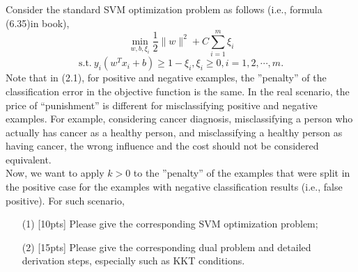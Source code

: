 \begin{problem}
    Consider the standard SVM optimization problem as follows (i.e., formula (6.35)in book),
    \[\min_{w,b,\xi_{i}}\frac{1}{2}\|w\|^2+C\sum_{i=1}^{m}\xi_i\]
    \[\mathrm{s.t.}~ y_i(w^Tx_i+b)\geq 1-\xi_i, \xi_i\geq 0,i=1,2,\cdots,m.\]
    Note that in (2.1), for positive and negative examples, the ”penalty” of the
    classification error in the objective function is the same. In the real scenario,
    the price of “punishment” is different for misclassifying positive and negative
    examples. For example, considering cancer diagnosis, misclassifying a person
    who actually has cancer as a healthy person, and misclassifying a healthy person
    as having cancer, the wrong influence and the cost should not be considered
    equivalent.\\
    Now, we want to apply $k > 0$ to the ”penalty” of the examples that were
    split in the positive case for the examples with negative classification results
    (i.e., false positive). For such scenario,
    \begin{enumerate}
        \item[(1)]  [10pts] Please give the corresponding SVM optimization problem;
        \item[(2)]  [15pts] Please give the corresponding dual problem and detailed derivation
            steps, especially such as KKT conditions.
    \end{enumerate}
\end{problem}



